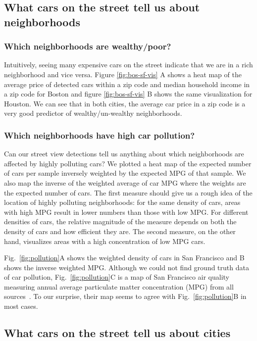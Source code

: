 \documentclass[10pt,twocolumn,letterpaper]{article}
\begin{document}
\subsection{What cars on the street tell us about neighborhoods}
\subsubsection{Which neighborhoods are wealthy/poor?}
Intuitively, seeing many expensive cars on the street indicate that we are in a rich neighborhood and vice versa. Figure \ref{fig:bos-sf-vis} A shows a heat map of the average price of detected cars within a zip code and median household income in a zip code for Boston and figure \ref{fig:bos-sf-vis} B shows the same visualization for Houston. We can see that in both cities, the average car price in a zip code is a very good predictor of wealthy/un-wealthy neighborhoods.


\subsubsection{Which neighborhoods have high car pollution?}
Can our street view detections tell us anything about which neighborhoods are affected by highly polluting cars? We plotted a heat map of the expected number of cars per sample inversely weighted by the expected MPG of that sample. We also map the inverse of the weighted average of car MPG where the weights are the expected number of cars. The first measure should give us a rough idea of the location of highly polluting neighborhoods: for the same density of cars, areas with high MPG result in lower numbers than those with low MPG. For different densities of cars, the relative magnitude of the measure depends on both the density of cars and how efficient they are. The second measure, on the other hand, visualizes areas with a high concentration of low MPG cars.

Fig.~\ref{fig:pollution}A shows the weighted density of cars in San Francisco and B shows the inverse weighted MPG. Although we could not find ground truth data of car pollution, Fig.~\ref{fig:pollution}C is a map of San Francisco air quality measuring annual average particulate matter concentration (MPG) from all sources~\cite{ground_air}. To our surprise, their map seems to agree with Fig.~\ref{fig:pollution}B in most cases.

\subsection{What cars on the street tell us about cities}
\end{document}
